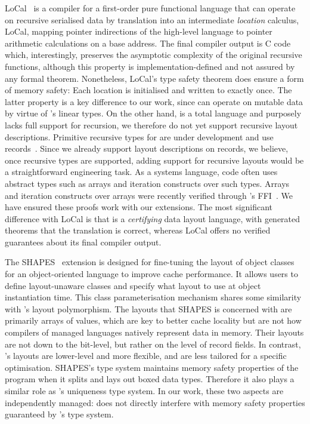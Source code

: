 LoCal~\citep{Vollmer:2019} is a compiler for a first-order pure functional
language that can operate on recursive serialised data by translation into an
intermediate \emph{location} calculus, LoCal, mapping pointer indirections of
the high-level language to pointer arithmetic calculations on a base address.
The final compiler output is C code which, interestingly, preserves the
asymptotic complexity of the original recursive functions, although this
property is implementation-defined and not assured by any formal theorem.
Nonetheless, LoCal's type safety theorem does ensure a form of memory safety:
Each location is initialised and written to exactly once. The latter property
is a key difference to our work, since \Dargent can operate on mutable data by
virtue of \cogent's linear types. On the other hand, \cogent is a total
language and purposely lacks full support for recursion, we therefore do not
yet support recursive layout descriptions. Primitive recursive types for
\cogent are under development and use records~\citep{Murray:2019}. Since
we already support layout descriptions on records, we believe, once recursive
types are supported, adding support for recursive layouts would be a
straightforward engineering task. As a systems language, \cogent code often
uses abstract types such as arrays and  iteration constructs over such types.
Arrays and iteration constructs over arrays were recently verified through
\cogent's FFI~\cite{Cheung_OR_22}. We have ensured these proofs work with our
\dargent extensions. The most significant difference with LoCal is that
\Dargent is a \emph{certifying} data layout language, with generated theorems
that the translation is correct, whereas LoCal offers no verified guarantees
about its final compiler output.

The SHAPES~\citep{Franco:17, Franco:19} extension is designed for fine-tuning 
the layout of object classes for an object-oriented language to improve cache performance. 
It allows
users to define layout-unaware classes and specify what layout to use at
object instantiation time. This class parameterisation mechanism shares
some similarity with \dargent's layout polymorphism. The layouts that SHAPES
is concerned with are primarily arrays of values, which are key to better
cache locality but are not how compilers
of managed languages natively represent data in memory. Their layouts are not
down to the bit-level, but rather on the level of record fields.
In contrast, \dargent's layouts are lower-level and more flexible, and
are less tailored for a specific optimisation. SHAPES's type system maintains
memory safety properties of the program when it splits and lays out
boxed data types. Therefore it also plays a similar role as \cogent's
uniqueness type system. In our work, these two aspects are independently managed:
\dargent does not directly interfere with memory safety properties guaranteed
by \cogent's type system. 


